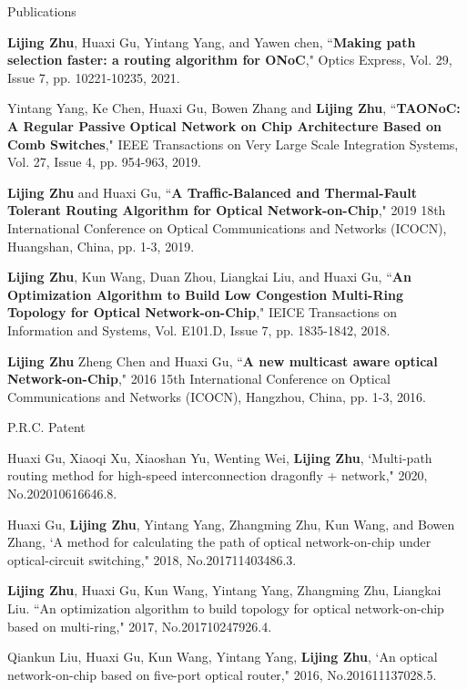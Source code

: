 \documentclass{resume} %
\begin{document}
\begin{rSection}{Publications}

\begin{rSubsection}{}{}{}{}
	\item {\bf Lijing Zhu}, Huaxi Gu, Yintang Yang, and Yawen chen, ``{\bf Making path selection faster: a routing algorithm for ONoC}," Optics Express, Vol. 29, Issue 7, pp. 10221-10235, 2021.
	\item Yintang Yang, Ke Chen, Huaxi Gu, Bowen Zhang and {\bf Lijing Zhu}, ``{\bf TAONoC: A Regular Passive Optical Network on Chip Architecture Based on Comb Switches},"  IEEE Transactions on Very Large Scale Integration Systems, Vol. 27, Issue 4, pp. 954-963, 2019.
	\item {\bf Lijing Zhu} and Huaxi Gu, ``{\bf A Traffic-Balanced and Thermal-Fault Tolerant Routing Algorithm for Optical Network-on-Chip}," 2019 18th International Conference on Optical Communications and Networks (ICOCN), Huangshan, China, pp. 1-3, 2019.
	\item {\bf Lijing Zhu}, Kun Wang, Duan Zhou, Liangkai Liu, and Huaxi Gu, ``{\bf An Optimization Algorithm to Build Low Congestion Multi-Ring Topology for Optical Network-on-Chip},"  IEICE Transactions on Information and Systems, Vol. E101.D, Issue 7, pp. 1835-1842, 2018.
	\item {\bf Lijing Zhu} Zheng Chen and Huaxi Gu, ``{\bf A new multicast aware optical Network-on-Chip}," 2016 15th International Conference on Optical Communications and Networks (ICOCN), Hangzhou, China, pp. 1-3, 2016.

\end{rSubsection}

\end{rSection}

\begin{rSection}{P.R.C. Patent}
	\begin{rSubsection}{}{}{}{}
	\item Huaxi Gu, Xiaoqi Xu, Xiaoshan Yu, Wenting Wei, {\bf Lijing Zhu}, `Multi-path routing method for high-speed interconnection dragonfly + network," 2020, No.202010616646.8.	
	\item Huaxi Gu, {\bf Lijing Zhu}, Yintang Yang, Zhangming Zhu, Kun Wang, and Bowen Zhang, `A method for calculating the path of optical network-on-chip under optical-circuit switching," 2018, No.201711403486.3.
	\item {\bf Lijing Zhu}, Huaxi Gu, Kun Wang, Yintang Yang, Zhangming Zhu, Liangkai Liu. ``An optimization algorithm to build topology for optical network-on-chip based on multi-ring," 2017, No.201710247926.4.
	\item Qiankun Liu, Huaxi Gu, Kun Wang, Yintang Yang, \textbf{Lijing Zhu}, `An optical network-on-chip based on five-port optical router," 2016, No.201611137028.5.

	\end{rSubsection}
\end{rSection}
\end{document}
